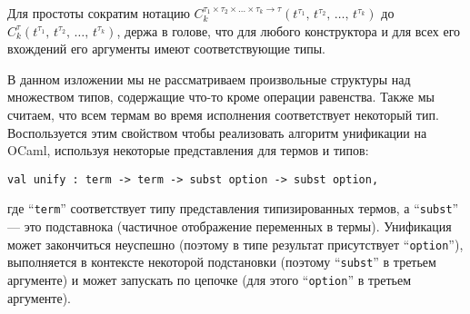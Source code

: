 \noindent Для простоты сократим нотацию  $C_k^{\tau_1\times\tau_2\times\dots\times\tau_k\to\tau}(t^{\tau_1},\,t^{\tau_2},\,\dots,\,t^{\tau_k})$ до
$C_k^\tau(t^{\tau_1},\,t^{\tau_2},\,\dots,\,t^{\tau_k})$, держа в голове, что для любого конструктора и для всех его вхождений его аргументы имеют соответствующие типы.


\begin{comment}
We need also to define the notion of a subterm  $t^\tau[p]$ of a term $t^\tau$ at given position $p$:

$$
\begin{array}{rcl}
 p=\epsilon\mid\{1, 2, 3,\dots\}\bullet p&-&\mbox{the set of positions}\\
 t^\tau[\epsilon]=t^\tau&-&\mbox{base case}\\
 C_k^\tau(t_1^{\tau_1},\,t_2^{\tau_2},\dots,\,t_k^{\tau_k})[i\bullet p]=t_i^{\tau_i}[p], 1\le i \le k&-&\mbox{inductive case}
\end{array}
$$
\end{comment}

В данном изложении мы не рассматриваем произвольные структуры над множеством типов, содержащие что-то кроме операции равенства.
Также мы считаем, что всем термам во время исполнения соответствует некоторый тип.
Воспользуется этим свойством чтобы реализовать алгоритм унификации на OCaml, используя некоторые представления для термов и типов:

\begin{lstlisting}[mathescape=true]
    val unify : term -> term -> subst option -> subst option,
\end{lstlisting}

\noindent где \enquote{\lstinline=term=} соответствует типу представления типизированных термов, а \enquote{\lstinline=subst=} --- это подставнока (частичное отображение переменных в термы).
Унификация может закончиться неуспешно (поэтому в типе результат присутствует \enquote{\lstinline=option=}),
выполняется в контексте некоторой подстановки (поэтому \enquote{\lstinline=subst=} в третьем аргументе) и может запускать по цепочке (для этого
\enquote{\lstinline=option=} в третьем аргументе).

